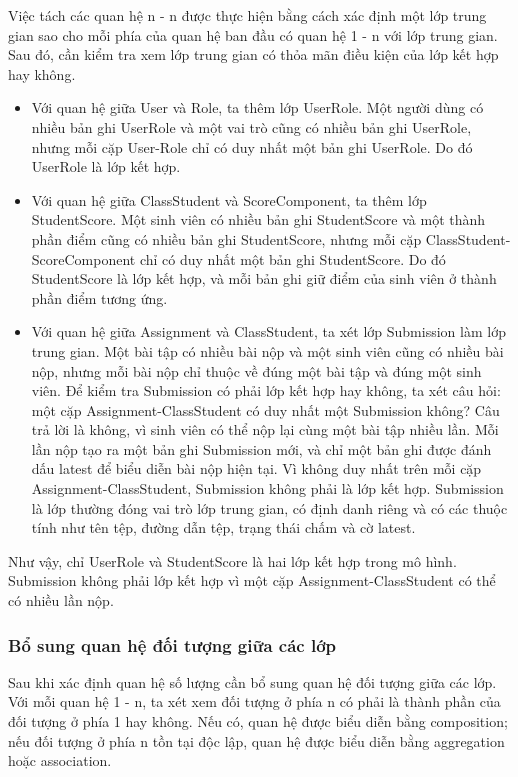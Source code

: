 \documentclass[../BTL.tex]{subfiles}
\begin{document}
Việc tách các quan hệ n - n được thực hiện bằng cách xác định một lớp trung gian sao cho mỗi phía của quan hệ ban đầu có quan hệ 1 - n với lớp trung gian. Sau đó, cần kiểm tra xem lớp trung gian có thỏa mãn điều kiện của lớp kết hợp hay không.

\begin{itemize}[leftmargin=*, nosep]
    \item Với quan hệ giữa User và Role, ta thêm lớp UserRole. Một người dùng có nhiều bản ghi UserRole và một vai trò cũng có nhiều bản ghi UserRole, nhưng mỗi cặp User-Role chỉ có duy nhất một bản ghi UserRole. Do đó UserRole là lớp kết hợp.
    \item Với quan hệ giữa ClassStudent và ScoreComponent, ta thêm lớp StudentScore. Một sinh viên có nhiều bản ghi StudentScore và một thành phần điểm cũng có nhiều bản ghi StudentScore, nhưng mỗi cặp ClassStudent-ScoreComponent chỉ có duy nhất một bản ghi StudentScore. Do đó StudentScore là lớp kết hợp, và mỗi bản ghi giữ điểm của sinh viên ở thành phần điểm tương ứng.
    \item Với quan hệ giữa Assignment và ClassStudent, ta xét lớp Submission làm lớp trung gian. Một bài tập có nhiều bài nộp và một sinh viên cũng có nhiều bài nộp, nhưng mỗi bài nộp chỉ thuộc về đúng một bài tập và đúng một sinh viên. Để kiểm tra Submission có phải lớp kết hợp hay không, ta xét câu hỏi: một cặp Assignment-ClassStudent có duy nhất một Submission không? Câu trả lời là không, vì sinh viên có thể nộp lại cùng một bài tập nhiều lần. Mỗi lần nộp tạo ra một bản ghi Submission mới, và chỉ một bản ghi được đánh dấu latest để biểu diễn bài nộp hiện tại. Vì không duy nhất trên mỗi cặp Assignment-ClassStudent, Submission không phải là lớp kết hợp. Submission là lớp thường đóng vai trò lớp trung gian, có định danh riêng và có các thuộc tính như tên tệp, đường dẫn tệp, trạng thái chấm và cờ latest.
\end{itemize}

Như vậy, chỉ UserRole và StudentScore là hai lớp kết hợp trong mô hình. Submission không phải lớp kết hợp vì một cặp Assignment-ClassStudent có thể có nhiều lần nộp.

\subsubsection{Bổ sung quan hệ đối tượng giữa các lớp}

Sau khi xác định quan hệ số lượng cần bổ sung quan hệ đối tượng giữa các lớp. Với mỗi quan hệ 1 - n, ta xét xem đối tượng ở phía n có phải là thành phần của đối tượng ở phía 1 hay không. Nếu có, quan hệ được biểu diễn bằng composition; nếu đối tượng ở phía n tồn tại độc lập, quan hệ được biểu diễn bằng aggregation hoặc association.
\end{document}
